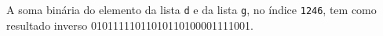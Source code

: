 \documentclass[12pt,varwidth=16cm,border=1pt]{standalone}
\begin{document}
A soma binária do elemento da lista \verb+d+ e da lista \verb+g+, no índice \verb+1246+, tem como resultado inverso 01011111011010110100001111001.

\questiomtrue
\end{document}
